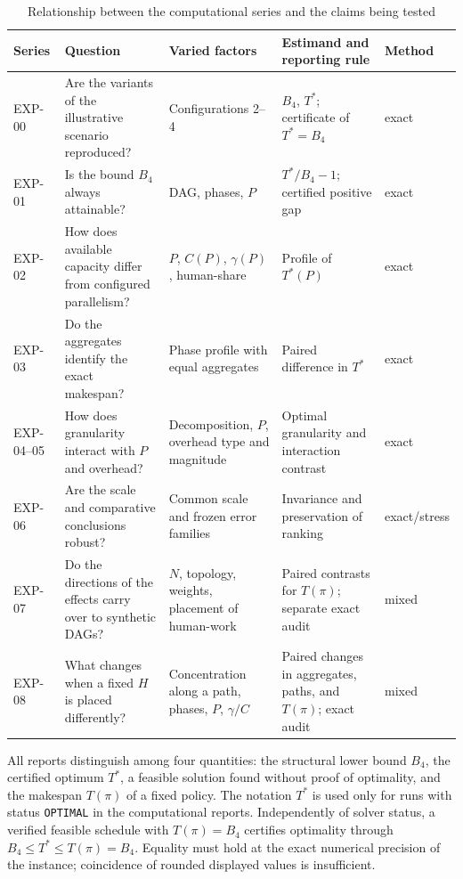\begin{table}[ht]
\centering
\scriptsize
\caption{Relationship between the computational series and the claims being tested}
\label{tab:experiment-design}
\begin{tabularx}{\textwidth}{@{}l>{\raggedright\arraybackslash}X>{\raggedright\arraybackslash}X>{\raggedright\arraybackslash}Xl@{}}
\toprule
Series & Question & Varied factors & Estimand and reporting rule & Method \\
\midrule
EXP-00 & Are the variants of the illustrative scenario reproduced? & Configurations 2--4 & $B_4$, $T^*$; certificate of $T^*=B_4$ & exact \\
EXP-01 & Is the bound $B_4$ always attainable? & DAG, phases, $P$ & $T^*/B_4-1$; certified positive gap & exact \\
EXP-02 & How does available capacity differ from configured parallelism? & $P$, $C(P)$, $\gamma(P)$, human-share & Profile of $T^*(P)$ & exact \\
EXP-03 & Do the aggregates identify the exact makespan? & Phase profile with equal aggregates & Paired difference in $T^*$ & exact \\
EXP-04--05 & How does granularity interact with $P$ and overhead? & Decomposition, $P$, overhead type and magnitude & Optimal granularity and interaction contrast & exact \\
EXP-06 & Are the scale and comparative conclusions robust? & Common scale and frozen error families & Invariance and preservation of ranking & exact/stress \\
EXP-07 & Do the directions of the effects carry over to synthetic DAGs? & $N$, topology, weights, placement of human-work & Paired contrasts for $T(\pi)$; separate exact audit & mixed \\
EXP-08 & What changes when a fixed $H$ is placed differently? & Concentration along a path, phases, $P$, $\gamma/C$ & Paired changes in aggregates, paths, and $T(\pi)$; exact audit & mixed \\
\bottomrule
\end{tabularx}
\end{table}

\FloatBarrier

All reports distinguish among four quantities: the structural lower bound $B_4$,
the certified optimum $T^*$, a feasible solution found without proof of
optimality, and the makespan $T(\pi)$ of a fixed policy. The notation $T^*$ is
used only for runs with status \texttt{OPTIMAL} in the computational reports.
Independently of solver status, a verified feasible schedule with
$T(\pi)=B_4$ certifies optimality through $B_4\le T^*\le T(\pi)=B_4$.
Equality must hold at the exact numerical precision of the instance;
coincidence of rounded displayed values is insufficient.

